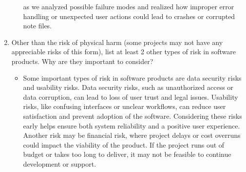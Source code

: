 \documentclass{article}
\begin{document}
\begin{enumerate}
\begin{itemize}
        as we analyzed possible failure modes and realized how improper error 
        handling or unexpected user actions could lead to crashes or corrupted note files. 
    \end{itemize} 
    \item Other than the risk of physical harm (some projects may not have any
    appreciable risks of this form), list at least 2 other types of risk in
    software products. Why are they important to consider?
    \begin{itemize}
        \item Some important types of risk in software products are data security 
        risks and usability risks. Data security risks, such as unauthorized access or data 
        corruption, can lead to loss of user trust and legal issues. Usability risks, like 
        confusing interfaces or unclear workflows, can reduce user satisfaction and prevent 
        adoption of the software. Considering these risks early helps ensure both system 
        reliability and a positive user experience. Another risk may be financial risk, 
        where project delays or cost overruns could impact the viability of the product.
        If the project runs out of budget or takes too long to deliver, it may not be
        feasible to continue development or support.
    \end{itemize} 
\end{enumerate}
\end{document}
